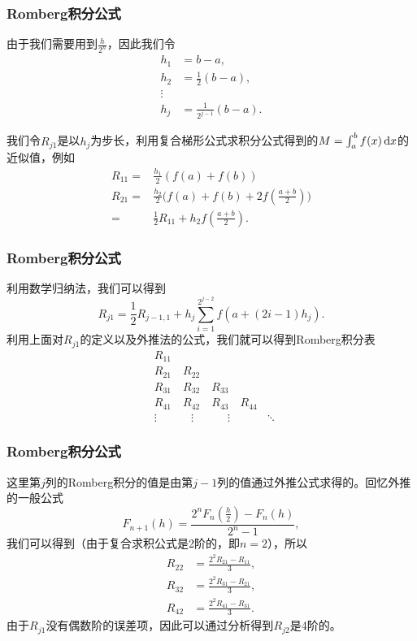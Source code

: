 \documentclass[10pt]{beamer}
\def\dx{\,{\rm d}x}
\begin{document}
\begin{frame}
\frametitle{Romberg积分公式}
由于我们需要用到$\frac{h}{2^n}$，因此我们令
\begin{align}
h_1 &= b-a, \nonumber \\
h_2 &= \frac{1}{2}(b-a), \nonumber \\
\vdots \nonumber \\
h_j &= \frac{1}{2^{j-1}}(b-a).
\end{align}

我们令$R_{j1}$是以$h_j$为步长，利用复合梯形公式求积分公式得到的$M = \int_a^b f(x) \dx$的近似值，例如
\begin{align}
R_{11}   = & \frac{h_1}{2}(f(a) + f(b)) \nonumber \\
R_{21}   = &\frac{h_2}{2}\big( f(a) + f(b) + 2 f(\frac{a+b}{2}) \big) \nonumber \\
              = &\frac{1}{2} R_11 + h_2 f(\frac{a+b}{2}).
\end{align}
\end{frame}


\begin{frame}
\frametitle{Romberg积分公式}
利用数学归纳法，我们可以得到
\begin{equation}
R_{j1} = \frac{1}{2} R_{j-1, 1} + h_j \sum_{i=1}^{2^{j-2}} f(a + (2i - 1)h_j).
\end{equation}
利用上面对$R_{j1}$的定义以及外推法的公式，我们就可以得到Romberg积分表
\begin{align}
&R_{11} \nonumber \\
&R_{21} \quad R_{22} \nonumber \\
&R_{31} \quad R_{32} \quad R_{33} \nonumber \\
&R_{41} \quad R_{42} \quad R_{43} \quad R_{44} \nonumber \\
&\vdots  \quad \quad \quad \vdots  \quad \quad \quad  \vdots \quad  \quad \quad  \ddots
\end{align}
\end{frame}


\begin{frame}
\frametitle{Romberg积分公式}
这里第$j$列的Romberg积分的值是由第$j-1$列的值通过外推公式求得的。回忆外推的一般公式
\begin{equation}
F_{n+1}(h) = \frac{2^n F_n(\frac{h}{2}) - F_n(h)}{2^n - 1},
\end{equation}
我们可以得到（由于复合求积公式是2阶的，即$n = 2$），所以
\begin{align}
R_{22} &= \frac{2^2 R_{21} - R_{11}}{3}, \nonumber \\
R_{32} &= \frac{2^2 R_{31} - R_{21}}{3}, \nonumber \\
R_{42} &= \frac{2^2 R_{41} - R_{31}}{3}.
\end{align}
由于$R_{j1}$没有偶数阶的误差项，因此可以通过分析得到$R_{j2}$是4阶的。
\end{frame}
\end{document}
